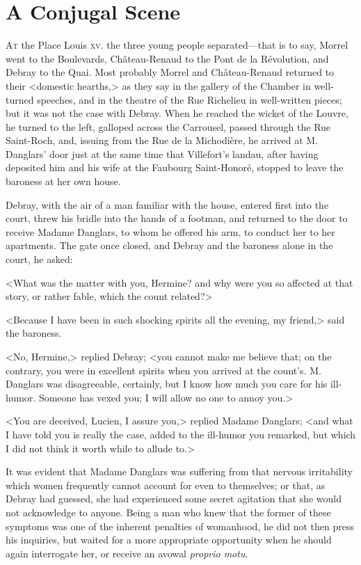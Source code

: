 \chapter{A Conjugal Scene} 

 \lettrine{A}{t} the Place Louis \textsc{xv.} the three young people separated—that is to say, Morrel went to the Boulevards, Château-Renaud to the Pont de la Révolution, and Debray to the Quai. Most probably Morrel and Château-Renaud returned to their <domestic hearths,> as they say in the gallery of the Chamber in well-turned speeches, and in the theatre of the Rue Richelieu in well-written pieces; but it was not the case with Debray. When he reached the wicket of the Louvre, he turned to the left, galloped across the Carrousel, passed through the Rue Saint-Roch, and, issuing from the Rue de la Michodière, he arrived at M. Danglars' door just at the same time that Villefort's landau, after having deposited him and his wife at the Faubourg Saint-Honoré, stopped to leave the baroness at her own house. 

 Debray, with the air of a man familiar with the house, entered first into the court, threw his bridle into the hands of a footman, and returned to the door to receive Madame Danglars, to whom he offered his arm, to conduct her to her apartments. The gate once closed, and Debray and the baroness alone in the court, he asked: 

 <What was the matter with you, Hermine? and why were you so affected at that story, or rather fable, which the count related?> 

 <Because I have been in such shocking spirits all the evening, my friend,> said the baroness. 

 <No, Hermine,> replied Debray; <you cannot make me believe that; on the contrary, you were in excellent spirits when you arrived at the count's. M. Danglars was disagreeable, certainly, but I know how much you care for his ill-humor. Someone has vexed you; I will allow no one to annoy you.> 

 <You are deceived, Lucien, I assure you,> replied Madame Danglars; <and what I have told you is really the case, added to the ill-humor you remarked, but which I did not think it worth while to allude to.> 

 It was evident that Madame Danglars was suffering from that nervous irritability which women frequently cannot account for even to themselves; or that, as Debray had guessed, she had experienced some secret agitation that she would not acknowledge to anyone. Being a man who knew that the former of these symptoms was one of the inherent penalties of womanhood, he did not then press his inquiries, but waited for a more appropriate opportunity when he should again interrogate her, or receive an avowal \textit{proprio motu}. 

